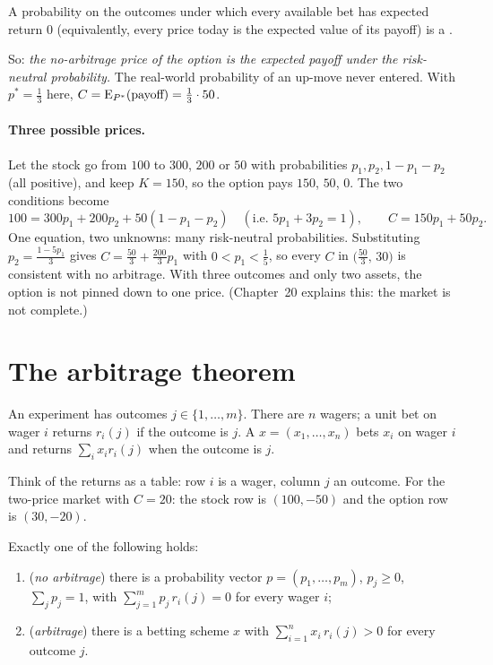 \begin{definition}
A probability on the outcomes under which every available bet has expected return $0$ (equivalently, every price today is the expected value of its payoff) is a .
\end{definition}

So: \emph{the no-arbitrage price of the option is the expected payoff under the risk-neutral probability.} The real-world probability of an up-move never entered. With $p^*=\frac13$ here, $C=\operatorname{E}_{P^*}(\text{payoff})=\frac13\cdot50$.

\paragraph{Three possible prices.} Let the stock go from $100$ to $300$, $200$ or $50$ with probabilities $p_1,p_2,1-p_1-p_2$ (all positive), and keep $K=150$, so the option pays $150$, $50$, $0$. The two conditions become
\[
  100=300p_1+200p_2+50(1-p_1-p_2)\quad(\text{i.e. }5p_1+3p_2=1),\qquad C=150p_1+50p_2 .
\]
One equation, two unknowns: many risk-neutral probabilities. Substituting $p_2=\frac{1-5p_1}{3}$ gives $C=\frac{50}{3}+\frac{200}{3}p_1$ with $0<p_1<\frac15$, so every $C$ in $\big(\frac{50}3,\,30\big)$ is consistent with no arbitrage. With three outcomes and only two assets, the option is not pinned down to one price. (Chapter~20 explains this: the market is not complete.)

\section{The arbitrage theorem}

\begin{setup}
An experiment has outcomes $j\in\{1,\dots,m\}$. There are $n$ wagers; a unit bet on wager $i$ returns $r_i(j)$ if the outcome is $j$. A  $x=(x_1,\dots,x_n)$ bets $x_i$ on wager $i$ and returns $\sum_ix_ir_i(j)$ when the outcome is $j$.
\end{setup}

Think of the returns as a table: row $i$ is a wager, column $j$ an outcome. For the two-price market with $C=20$: the stock row is $(100,-50)$ and the option row is $(30,-20)$.

\begin{theorem}
\label{thm:arbitrage}
Exactly one of the following holds:
\begin{enumerate}[label=(\roman*)]
  \item (\emph{no arbitrage}) there is a probability vector $p=(p_1,\dots,p_m)$, $p_j\ge0$, $\sum_jp_j=1$, with $\displaystyle\sum_{j=1}^mp_j\,r_i(j)=0$ for every wager $i$;
  \item (\emph{arbitrage}) there is a betting scheme $x$ with $\displaystyle\sum_{i=1}^nx_i\,r_i(j)>0$ for every outcome $j$.
\end{enumerate}
\end{theorem}
\noproof

